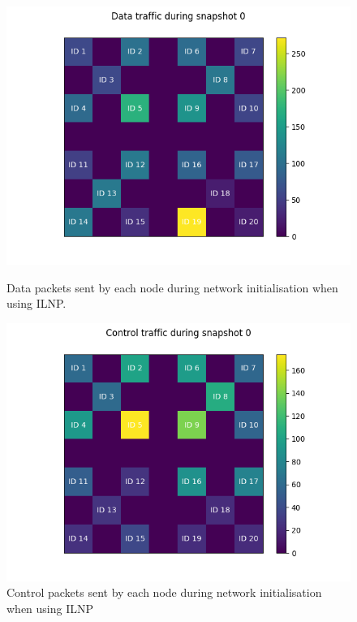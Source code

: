 \documentclass[12pt]{article}
\begin{document}
\begin{figure}[!ht]
    \centering
    \begin{minipage}{0.45\textwidth}
        \centering
        \includegraphics[width=\textwidth]{images/ilnp/snapshot0-Data.png} %
        \caption{Data packets sent by each node during network initialisation when using ILNP.}
        \label{fig:datasnapone}
    \end{minipage}\hfill
    \begin{minipage}{0.45\textwidth}
        \centering
        \includegraphics[width=\textwidth]{images/ilnp/snapshot0-Control.png} %
        \caption{Control packets sent by each node during network initialisation when using ILNP}
        \label{fig:ctrlsnapone}
    \end{minipage}
\end{figure}
\end{document}
